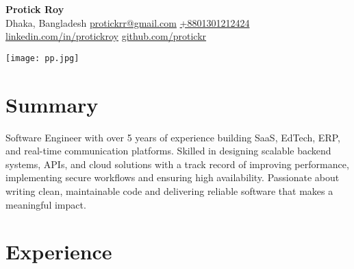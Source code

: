 \documentclass[a4paper,10pt]{article}
\begin{document}
\noindent
\begin{minipage}[c]{0.78\textwidth}
    {\Huge \textbf{Protick Roy}}\\[4pt]
    \small Dhaka, Bangladesh \textbar{}
    \href{mailto:protickrr@gmail.com}{protickrr@gmail.com} \textbar{}
    \href{tel:+8801301212424}{+8801301212424} \textbar{}
    \href{https://www.linkedin.com/in/protickroy}{linkedin.com/in/protickroy} 
    \href{https://github.com/protickr}{github.com/protickr}
\end{minipage}
\hfill
\begin{minipage}[c]{0.12\textwidth}
    \texttt{[image: pp.jpg]} %
\end{minipage}

\vspace{8pt}

\section*{Summary}
Software Engineer with over 5 years of experience building SaaS, EdTech, ERP, and real-time communication platforms.
Skilled in designing scalable backend systems, APIs, and cloud solutions with a track record of improving performance,
implementing secure workflows and ensuring high availability.
Passionate about writing clean, maintainable code and delivering reliable software that makes a meaningful impact.

\vspace{6pt}

\section*{Experience}
\end{document}
